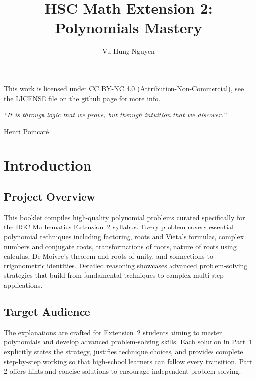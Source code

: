 \documentclass[12pt]{article}
\author{Vu Hung Nguyen}
\title{HSC Math Extension 2: Polynomials Mastery}
\date{}
\begin{document}


\newpage


\begingroup\small\noindent This work is licensed under CC BY-NC 4.0 (Attribution-Non-Commercial), see the LICENSE file on the github page for more info.\par\endgroup

\newpage
\thispagestyle{empty}
\vspace*{\fill}
\begin{center}
\itshape
``It is through logic that we prove, but through intuition that we discover.''

\vspace{1em}
\normalfont Henri Poincar\'e
\end{center}
\vspace*{\fill}

\newpage
\tableofcontents
\newpage

\section{Introduction}

\subsection{Project Overview}
This booklet compiles high-quality polynomial problems curated specifically for the HSC Mathematics Extension~2 syllabus. Every problem covers essential polynomial techniques including factoring, roots and Vieta's formulas, complex numbers and conjugate roots, transformations of roots, nature of roots using calculus, De Moivre's theorem and roots of unity, and connections to trigonometric identities. Detailed reasoning showcases advanced problem-solving strategies that build from fundamental techniques to complex multi-step applications.

\subsection{Target Audience}
The explanations are crafted for Extension~2 students aiming to master polynomials and develop advanced problem-solving skills. Each solution in Part~1 explicitly states the strategy, justifies technique choices, and provides complete step-by-step working so that high-school learners can follow every transition. Part 2 offers hints and concise solutions to encourage independent problem-solving.
\end{document}
